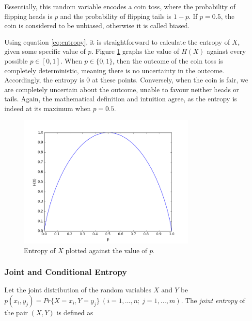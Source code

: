 \documentclass[12pt]{article}
\begin{document}
Essentially, this random variable encodes a coin toss, where the probability of flipping heads is $p$ and the probability of flipping tails is $1-p$. If $p=0.5$, the coin is considered to be unbiased, otherwise it is called biased.

Using equation \ref{eq:entropy}, it is straightforward to calculate the entropy of $X$, given some specific value of $p$. Figure \ref{fig:entropy} graphs the value of $H(X)$ against every possible $p \in \left[ 0, 1 \right]$. When $p \in \{0, 1\}$, then the outcome of the coin toss is completely deterministic, meaning there is no uncertainty in the outcome. Accordingly, the entropy is 0 at these points. Conversely, when the coin is fair, we are completely uncertain about the outcome, unable to favour neither heads or tails. Again, the mathematical definition and intuition agree, as the entropy is indeed at its maximum when $p = 0.5$.

\begin{figure} [h]
\begin{center}
\includegraphics[width=0.8\textwidth]{entropy}
\caption{Entropy of $X$ plotted against the value of $p$.}
\label{fig:entropy}
\end{center}
\end{figure}

\subsubsection{Joint and Conditional Entropy}

Let the joint distribution of the random variables $X$ and $Y$ be $p(x_i, y_j) = Pr\{X = x_i, Y = y_j\} \ (i = 1, ..., n; \ j = 1, ..., m)$. The \textit{joint entropy} \cite{cover-thomas} of the pair $(X,Y)$ is defined as 
\end{document}
